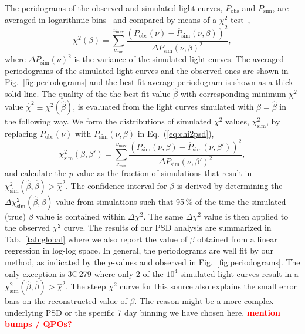 \documentclass[twocolumn]{aastex62}
\newcommand{\todo}[1]{\textbf{\textcolor{red}{#1}}}
\begin{document}
The peridograms of the observed and simulated light curves, ${P}_\mathrm{obs}$ and ${P}_\mathrm{sim}$, are averaged in logarithmic bins~\citep{1993MNRAS.261..612P} and compared by means of a $\chi^2$ test~\citep{2014MNRAS.445..437M},
\begin{equation}
    \chi^2(\beta) = \sum_{\nu_\mathrm{min}}^{\nu_\mathrm{max}}\frac{(P_\mathrm{obs}(\nu) - \overline{P}_\mathrm{sim}(\nu,\beta))^2}{\Delta\overline{P}_\mathrm{sim}(\nu,\beta)^2},\label{eq:chi2psd}
\end{equation}
where $\Delta\overline{P}_\mathrm{sim}(\nu)^2$ is the variance of the simulated light curves.
The averaged periodograms of the simulated light curves and the observed ones are shown in Fig.~\ref{fig:periodograms} and the best fit average periodogram is shown as a thick solid line. 
The quality of the the best-fit value $\hat\beta$ with corresponding minimum $\chi^2$ value $\hat\chi^2\equiv\chi^2(\hat\beta)$, is evaluated from the light curves simulated with $\beta = \hat\beta$ in the following way. We form the distributions of simulated $\chi^2$ values, $\chi^2_\mathrm{sim}$, by replacing $P_\mathrm{obs}(\nu)$ with $P_\mathrm{sim}(\nu,\beta)$ in Eq.~(\ref{eq:chi2psd}),
\begin{equation}
    \chi^2_\mathrm{sim}(\beta,\beta') = \sum_{\nu_\mathrm{min}}^{\nu_\mathrm{max}}\frac{(P_\mathrm{sim}(\nu,\beta) - \overline{P}_\mathrm{sim}(\nu,\beta'))^2}{\Delta\overline{P}_\mathrm{sim}(\nu,\beta')^2},\label{eq:chi2psd_sim}
\end{equation}
and calculate the $p$-value as the  fraction of simulations that result in $\chi^2_\mathrm{sim}(\hat\beta,\hat\beta) > \hat\chi^2$.
The confidence interval for $\hat\beta$ is derived by determining the $\Delta\chi^2_\mathrm{sim}(\hat{\beta},\beta)$ value from simulations such that 95\,\% of the time the simulated (true) $\beta$ value is contained within $\Delta\chi^2$. 
The same $\Delta\chi^2$ value is then applied to the observed $\chi^2$ curve.
The results of our PSD analysis are summarized in Tab.~\ref{tab:global} where we also report the value of $\beta$ obtained from a linear regression in log-log space. 
In general, the periodograms are well fit by our method, as indicated by the $p$-values and observed in Fig.~\ref{fig:periodograms}. 
The only exception is 3C\,279 where only 2 of the $10^4$ simulated light curves result in a $\chi^2_\mathrm{sim}(\hat\beta,\hat\beta) > \hat\chi^2$.
The steep $\chi^2$ curve for this source also explains the small error bars on the reconstructed value of $\beta$.
The reason might be a more complex underlying PSD or the specific 7 day binning we have chosen here. 
\todo{mention bumps / QPOs?}
\end{document}
